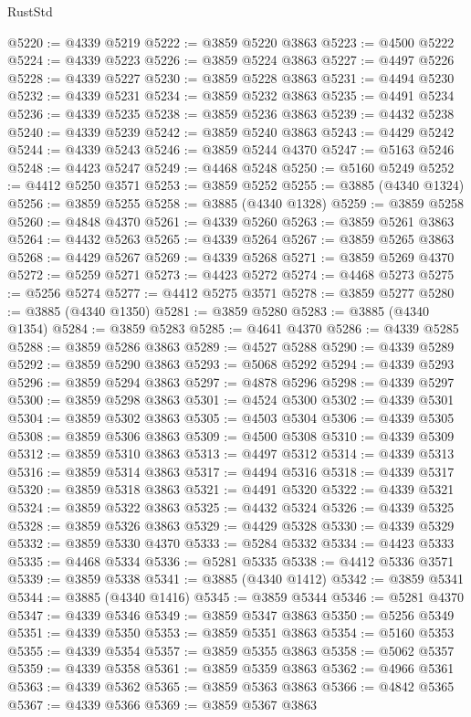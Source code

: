\begin{lexlean}{RustStd}
\begin{coremodule}
@5220 := @4339 @5219
@5222 := @3859 @5220 @3863
@5223 := @4500 @5222
@5224 := @4339 @5223
@5226 := @3859 @5224 @3863
@5227 := @4497 @5226
@5228 := @4339 @5227
@5230 := @3859 @5228 @3863
@5231 := @4494 @5230
@5232 := @4339 @5231
@5234 := @3859 @5232 @3863
@5235 := @4491 @5234
@5236 := @4339 @5235
@5238 := @3859 @5236 @3863
@5239 := @4432 @5238
@5240 := @4339 @5239
@5242 := @3859 @5240 @3863
@5243 := @4429 @5242
@5244 := @4339 @5243
@5246 := @3859 @5244 @4370
@5247 := @5163 @5246
@5248 := @4423 @5247
@5249 := @4468 @5248
@5250 := @5160 @5249
@5252 := @4412 @5250 @3571
@5253 := @3859 @5252
@5255 := @3885 (@4340 @1324)
@5256 := @3859 @5255
@5258 := @3885 (@4340 @1328)
@5259 := @3859 @5258
@5260 := @4848 @4370
@5261 := @4339 @5260
@5263 := @3859 @5261 @3863
@5264 := @4432 @5263
@5265 := @4339 @5264
@5267 := @3859 @5265 @3863
@5268 := @4429 @5267
@5269 := @4339 @5268
@5271 := @3859 @5269 @4370
@5272 := @5259 @5271
@5273 := @4423 @5272
@5274 := @4468 @5273
@5275 := @5256 @5274
@5277 := @4412 @5275 @3571
@5278 := @3859 @5277
@5280 := @3885 (@4340 @1350)
@5281 := @3859 @5280
@5283 := @3885 (@4340 @1354)
@5284 := @3859 @5283
@5285 := @4641 @4370
@5286 := @4339 @5285
@5288 := @3859 @5286 @3863
@5289 := @4527 @5288
@5290 := @4339 @5289
@5292 := @3859 @5290 @3863
@5293 := @5068 @5292
@5294 := @4339 @5293
@5296 := @3859 @5294 @3863
@5297 := @4878 @5296
@5298 := @4339 @5297
@5300 := @3859 @5298 @3863
@5301 := @4524 @5300
@5302 := @4339 @5301
@5304 := @3859 @5302 @3863
@5305 := @4503 @5304
@5306 := @4339 @5305
@5308 := @3859 @5306 @3863
@5309 := @4500 @5308
@5310 := @4339 @5309
@5312 := @3859 @5310 @3863
@5313 := @4497 @5312
@5314 := @4339 @5313
@5316 := @3859 @5314 @3863
@5317 := @4494 @5316
@5318 := @4339 @5317
@5320 := @3859 @5318 @3863
@5321 := @4491 @5320
@5322 := @4339 @5321
@5324 := @3859 @5322 @3863
@5325 := @4432 @5324
@5326 := @4339 @5325
@5328 := @3859 @5326 @3863
@5329 := @4429 @5328
@5330 := @4339 @5329
@5332 := @3859 @5330 @4370
@5333 := @5284 @5332
@5334 := @4423 @5333
@5335 := @4468 @5334
@5336 := @5281 @5335
@5338 := @4412 @5336 @3571
@5339 := @3859 @5338
@5341 := @3885 (@4340 @1412)
@5342 := @3859 @5341
@5344 := @3885 (@4340 @1416)
@5345 := @3859 @5344
@5346 := @5281 @4370
@5347 := @4339 @5346
@5349 := @3859 @5347 @3863
@5350 := @5256 @5349
@5351 := @4339 @5350
@5353 := @3859 @5351 @3863
@5354 := @5160 @5353
@5355 := @4339 @5354
@5357 := @3859 @5355 @3863
@5358 := @5062 @5357
@5359 := @4339 @5358
@5361 := @3859 @5359 @3863
@5362 := @4966 @5361
@5363 := @4339 @5362
@5365 := @3859 @5363 @3863
@5366 := @4842 @5365
@5367 := @4339 @5366
@5369 := @3859 @5367 @3863

\end{coremodule}
\end{lexlean}
